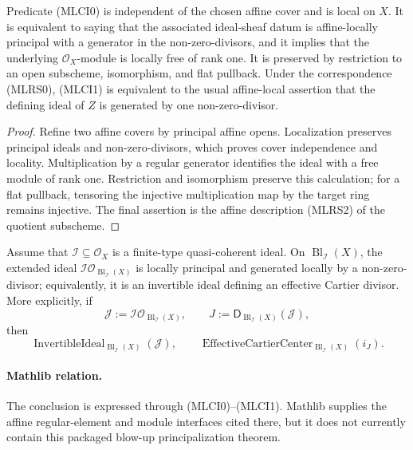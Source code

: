 \begin{lemma}
  \label{lemma:nagata-invertible-ideal-effective-cartier}

  Predicate (MLCI0) is independent of the chosen affine cover and is local
  on $X$.  It is equivalent to saying that the associated ideal-sheaf datum
  is affine-locally principal with a generator in the non-zero-divisors, and
  it implies that the underlying $\mathcal O_X$-module is locally free of
  rank one.  It is preserved by restriction to an open subscheme,
  isomorphism, and flat pullback.  Under the correspondence (MLRS0), (MLCI1)
  is equivalent to the usual affine-local assertion that the defining ideal
  of $Z$ is generated by one non-zero-divisor.
\end{lemma}

\begin{proof}
  Refine two affine covers by principal affine opens.  Localization preserves
  principal ideals and non-zero-divisors, which proves cover independence
  and locality.  Multiplication by a regular generator identifies the ideal
  with a free module of rank one.  Restriction and isomorphism preserve this
  calculation; for a flat pullback, tensoring the injective multiplication
  map by the target ring remains injective.  The final assertion is the
  affine description (MLRS2) of the quotient subscheme.
\end{proof}

\begin{theorem}
  \label{thm:nagata-blowup-principalizes-center}

  Assume that $\mathcal I\subseteq\mathcal O_X$ is a finite-type
  quasi-coherent ideal.  On $\operatorname{Bl}_{\mathcal I}(X)$, the extended ideal
  $\mathcal I\mathcal O_{\operatorname{Bl}_{\mathcal I}(X)}$ is locally
  principal and generated locally by a non-zero-divisor; equivalently, it is
  an
  invertible ideal defining an effective Cartier divisor.
  More explicitly, if
  \[
    \mathcal J:=
      \mathcal I\mathcal O_{\operatorname{Bl}_{\mathcal I}(X)},
    \qquad J:=\mathsf D_{\operatorname{Bl}_{\mathcal I}(X)}(\mathcal J),
  \]
  then
  \[
    \operatorname{InvertibleIdeal}_{\operatorname{Bl}_{\mathcal I}(X)}
      (\mathcal J),
    \qquad
    \operatorname{EffectiveCartierCenter}_{\operatorname{Bl}_{\mathcal I}(X)}
      (i_J).
  \]

  \paragraph{Mathlib relation.}
  The conclusion is expressed through (MLCI0)--(MLCI1).  Mathlib supplies
  the affine regular-element and module interfaces cited there, but it does
  not currently contain this packaged blow-up principalization theorem.
\end{theorem}

